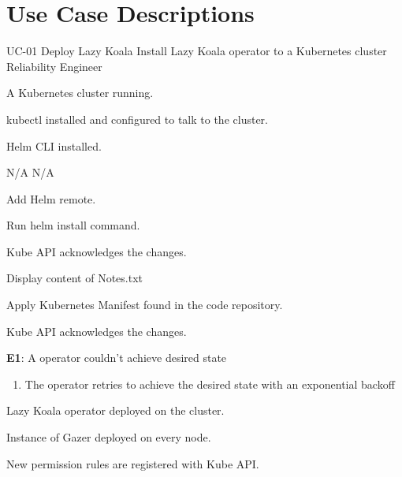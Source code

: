{\let\clearpage\relax\chapter{Use Case Descriptions}\label{appendix:use-case-description}}

\UseCaseDescription
{UC-01}
{Deploy Lazy Koala}
{Install Lazy Koala operator to a Kubernetes cluster}
{Reliability Engineer}
{\begin{CompactItemizes}
    \item A Kubernetes cluster running.
    \item kubectl installed and configured to talk to the cluster.
    \item Helm CLI installed.
\end{CompactItemizes}}
{N/A}
{N/A}
{\begin{CompactEnumerate}
    \item Add Helm remote.
    \item Run helm install command.
    \item Kube API acknowledges the changes.
    \item Display content of Notes.txt
\end{CompactEnumerate}}
{{\begin{CompactEnumerate}
    \item Apply Kubernetes Manifest found in the code repository.
    \item Kube API acknowledges the changes.
\end{CompactEnumerate}}
{\textbf{E1}: A operator couldn’t achieve desired state
\vspace{-4mm}\begin{enumerate}
    \item The operator retries to achieve the desired state with an exponential backoff
\vspace{-7mm}\end{enumerate}}
{\begin{CompactItemizes}
    \item Lazy Koala operator deployed on the cluster.
    \item Instance of Gazer deployed on every node.
    \item New permission rules are registered with Kube API.
\end{CompactItemizes}}}

